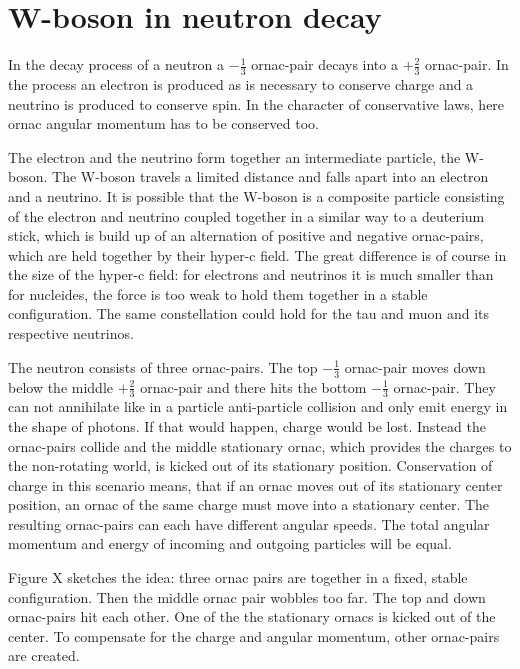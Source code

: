 \section{W-boson in neutron decay}

In the decay process of a neutron a $-\frac{1}{3}$ ornac-pair decays into a $+\frac{2}{3}$ ornac-pair. In the process an electron is produced as is necessary to conserve charge and a neutrino is produced to conserve spin. In the character of conservative laws, here ornac angular momentum has to be conserved too.

The electron and the neutrino form together an intermediate particle, the W-boson. The W-boson travels a limited distance and falls apart into an electron and a neutrino. It is possible that the W-boson is a composite particle consisting of the electron and neutrino coupled together in a similar way to a deuterium stick, which is build up of an alternation of positive and negative ornac-pairs, which are held together by their hyper-c field. The great difference is of course in the size of the hyper-c field: for electrons and neutrinos it is much smaller than for nucleides, the force is too weak to hold them together in a stable configuration. The same constellation could hold for the tau and muon and its respective neutrinos.

The neutron consists of three ornac-pairs. The top $-\frac{1}{3}$ ornac-pair moves down below the middle $+\frac{2}{3}$ ornac-pair and there hits the bottom $-\frac{1}{3}$ ornac-pair. They can not annihilate like in a particle anti-particle collision and only emit energy in  the shape of photons. If that would happen, charge would be lost. Instead the ornac-pairs collide and the middle stationary ornac, which provides the charges to the non-rotating world, is kicked out of its stationary position. Conservation of charge in this scenario means, that if an ornac moves out of its stationary center position, an ornac of the same charge must move into a stationary center. The resulting ornac-pairs can each have different angular speeds. The total angular momentum and energy of incoming and outgoing particles will be equal.

Figure X sketches the idea: three ornac pairs are together in a fixed, stable configuration. Then the middle ornac pair wobbles too far. The top and down ornac-pairs hit each other. One of the the stationary ornacs is kicked out of the center. To compensate for the charge and angular momentum, other ornac-pairs are created.




